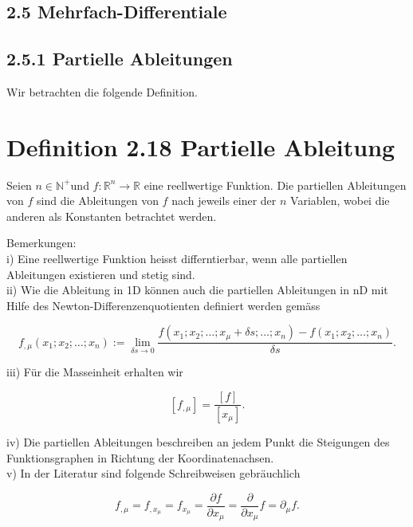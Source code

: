 \documentclass[10pt]{article}
\begin{document}
\subsection*{2.5 Mehrfach-Differentiale}
\subsection*{2.5.1 Partielle Ableitungen}
Wir betrachten die folgende Definition.

\section*{Definition 2.18 Partielle Ableitung}
Seien $n \in \mathbb{N}^{+}$und $f: \mathbb{R}^{n} \rightarrow \mathbb{R}$ eine reellwertige Funktion. Die partiellen Ableitungen von $f$ sind die Ableitungen von $f$ nach jeweils einer der $n$ Variablen, wobei die anderen als Konstanten betrachtet werden.

Bemerkungen:\\
i) Eine reellwertige Funktion heisst differntierbar, wenn alle partiellen Ableitungen existieren und stetig sind.\\
ii) Wie die Ableitung in 1D können auch die partiellen Ableitungen in nD mit Hilfe des Newton-Differenzenquotienten definiert werden gemäss


\begin{equation*}
f_{, \mu}\left(x_{1} ; x_{2} ; \ldots ; x_{n}\right):=\lim _{\delta s \rightarrow 0} \frac{f\left(x_{1} ; x_{2} ; \ldots ; x_{\mu}+\delta s ; \ldots ; x_{n}\right)-f\left(x_{1} ; x_{2} ; \ldots ; x_{n}\right)}{\delta s} . \tag{2.134}
\end{equation*}


iii) Für die Masseinheit erhalten wir


\begin{equation*}
\left[f_{, \mu}\right]=\frac{[f]}{\left[x_{\mu}\right]} . \tag{2.135}
\end{equation*}


iv) Die partiellen Ableitungen beschreiben an jedem Punkt die Steigungen des Funktionsgraphen in Richtung der Koordinatenachsen.\\
v) In der Literatur sind folgende Schreibweisen gebräuchlich


\begin{equation*}
f_{, \mu}=f_{, x_{\mu}}=f_{x_{\mu}}=\frac{\partial f}{\partial x_{\mu}}=\frac{\partial}{\partial x_{\mu}} f=\partial_{\mu} f . \tag{2.136}
\end{equation*}
\end{document}
